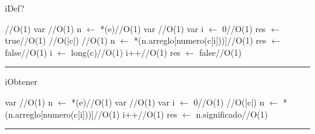 \begin{algorithm}[H]
\caption{iDef?}
\begin{algorithmic}[1]
\hfill //O(1)
\state var \hfill //O(1)
\state n $\gets$ *(e)\hfill //O(1)
\state var \hfill //O(1)
\state var i $\gets$ 0\hfill //O(1)
\state res $\gets$ true\hfill //O(1)
\hfill //O(|c|)
\hfill //O(1)
\State n $\gets$ *(n.arreglo[numero(c[i]))]\hfill //O(1)
\Else
\State res $\gets$ false\hfill //O(1)
\state i $\gets$ long(c)\hfill //O(1)
\EndIf 
\state i++\hfill //O(1)
\endwhile
\Else
\state res $\gets$ false\hfill //O(1)
\EndIf
\EndFunction 
\end{algorithmic}
\hrule
{}
\end{algorithm}


\begin{algorithm}[H]
\caption{iObtener}
\begin{algorithmic}[1]
\state var \hfill //O(1)
\state n $\gets$ *(e)\hfill //O(1)
\state var \hfill //O(1)
\state var i $\gets$ 0\hfill //O(1)
\hfill //O(|c|)
\State n $\gets$ *(n.arreglo[numero(c[i]))]\hfill //O(1)
\state i++\hfill //O(1)
\endwhile
\state res $\gets$ n.significado\hfill //O(1)
\EndFunction 
\end{algorithmic}
\hrule
{}
\end{algorithm}


